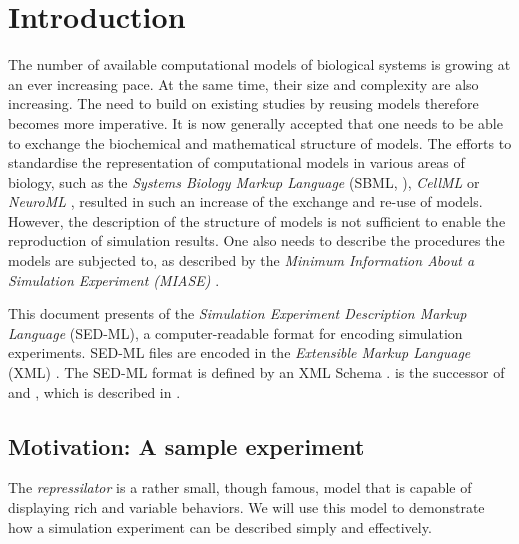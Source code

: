 \chapter{Introduction}

The number of available computational models of biological systems is growing at an ever increasing pace. 
At the same time, their size and complexity are also increasing. The need to build on existing studies by reusing models therefore becomes more imperative. It is now generally accepted that one needs to be able to exchange the biochemical and mathematical structure of models. The efforts to standardise the representation of computational models in various areas of biology, such as the \emph{Systems Biology Markup Language} (SBML, \citep{Hucka:2003}), \emph{CellML} \citep{cuellar:2003} or \emph{NeuroML} \citep{Goddard:2001}, resulted in such an increase of the exchange and re-use of models. 
However, the description of the structure of models is not sufficient to enable the reproduction of simulation results.  
One also needs to describe the procedures the models are subjected to, as described by the \emph{Minimum Information About a Simulation Experiment (MIASE)} \citep{Waltemath:2011}. 

This document presents  \currentLV of the \emph{Simulation Experiment Description Markup Language} (SED-ML), a computer-readable format for encoding simulation experiments. SED-ML files are encoded in the \emph{Extensible Markup Language} (XML) \citep{Bray:2006}. The SED-ML format is defined by an XML Schema \citep{Fallside:2001}. \currentLV is the successor of \previousLV and \LoneVone, which is described in \citep{WAB+11}.

\section{Motivation: A sample experiment}
\label{motivation:example}

The \emph{repressilator} is a rather small, though famous, model that is capable of displaying rich and variable behaviors. We will use this model to demonstrate how a simulation experiment can be described simply and effectively. 

